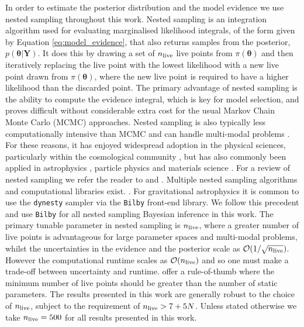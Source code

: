 \documentclass[fleqn,usenatbib,useAMS]{mnras}
\begin{document}
In order to estimate the posterior distribution and the model evidence we use nested sampling \citep{Skilling} throughout this work. Nested sampling is an integration algorithm used for evaluating marginalised likelihood integrals, of the form given by Equation \eqref{eq:model_evidence}, that also returns samples from the posterior, $p(\boldsymbol{\theta} | \boldsymbol{Y})$. It does this by drawing a set of $n_{\rm live}$ live points from $\pi(\boldsymbol{\theta})$ and then iteratively replacing the live point with the lowest likelihood with a new live point drawn from $\pi(\boldsymbol{\theta})$, where the new live point is required to have a higher likelihood than the discarded point. The primary advantage of nested sampling is the ability to compute the evidence integral, which is key for model selection, and proves difficult without considerable extra cost for the usual Markov Chain Monte Carlo (MCMC) approaches. Nested sampling is also typically less computationally intensive than MCMC and can handle multi-modal problems \citep{Ashton2022}. For these reasons, it has enjoyed widespread adoption in the physical sciences, particularly within the cosmological community \citep{Mukherjee2006,Feroz2008,Handley2015}, but has also commonly been applied in astrophysics \citep{UltraNest2021}, particle physics \citep{proceedings2019033014} and materials science \citep{2009arXiv0906materials}. For a review of nested sampling we refer the reader to \cite{Buchner2021} and \cite{Ashton2022}. Multiple nested sampling algorithms and computational libraries exist. \citep[e.g.][]{Feroz2008,Feroz2009,Handley2015,dynesty2020,UltraNest2021}. For gravitational astrophysics it is common to use the \texttt{dynesty} sampler \citep{dynesty2020} via the \texttt{Bilby} \citep{bilby.507.2037A} front-end library. We  follow this precedent and use \texttt{Bilby} for all nested sampling Bayesian inference in this work. The primary tunable parameter in nested sampling is $n_{\rm live}$, where a greater number of live points is advantageous for large parameter spaces and multi-modal problems, whilst the uncertainties in the evidence and the posterior scale as $\mathcal{O}(1/\sqrt{n_{\rm live}})$. However the computational runtime scales as $\mathcal{O}(n_{\rm live})$ and so one must make a trade-off between uncertainty and runtime. \cite{Ashton2022} offer a rule-of-thumb where the minimum number of live points should be greater than the number of static parameters. The results presented in this work are generally robust to the choice of $n_{\rm live}$, subject to the requirement of $n_{\rm live} > 7 + 5N$. Unless stated otherwise we take $n_{\rm live} = 500$ for all results presented in this work. \newline 
\end{document}
